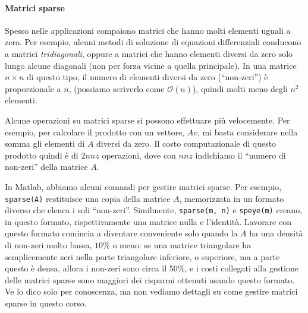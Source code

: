 \documentclass[a4paper]{report}
\theoremstyle{definition}
\theoremstyle{remark}
\begin{document}
\paragraph{Matrici sparse} Spesso nelle applicazioni compaiono matrici che hanno molti elementi uguali a zero. Per esempio, alcuni metodi di soluzione di equazioni differenziali conducono a matrici \emph{tridiagonali}, oppure a matrici che hanno elementi diversi da zero solo lungo alcune diagonali (non per forza vicine a quella principale). In una matrice $n\times n$ di questo tipo, il numero di elementi diversi da zero (``non-zeri'') è proporzionale a $n$, (possiamo scriverlo come $\mathcal{O}(n)$), quindi molti meno degli $n^2$ elementi.

Alcune operazioni su matrici sparse si possono effettuare più velocemente. Per esempio, per calcolare il prodotto con un vettore, $Av$, mi basta considerare nella somma gli elementi di $A$ diversi da zero. Il costo computazionale di questo prodotto quindi è di $2nnz$ operazioni, dove con $nnz$ indichiamo il ``numero di non-zeri'' della matrice $A$.

In Matlab, abbiamo alcuni comandi per gestire matrici sparse. Per esempio, \lstinline{sparse(A)} restituisce una copia della matrice $A$, memorizzata in un formato diverso che elenca i soli ``non-zeri''. Similmente, \lstinline{sparse(m, n)} e \lstinline{speye(m)} creano, in questo formato, rispettivamente una matrice nulla e l'identità. Lavorare con questo formato comincia a diventare conveniente solo quando la $A$ ha una densità di non-zeri molto bassa, $10\%$ o meno: se una matrice triangolare ha semplicemente zeri nella parte triangolare inferiore, o superiore, ma a parte questo è densa, allora i non-zeri sono circa il $50\%$, e i costi collegati alla gestione delle matrici sparse sono maggiori dei risparmi ottenuti usando questo formato. Ve lo dico solo per conoscenza, ma non vediamo dettagli su come gestire matrici sparse in questo corso.
\end{document}
